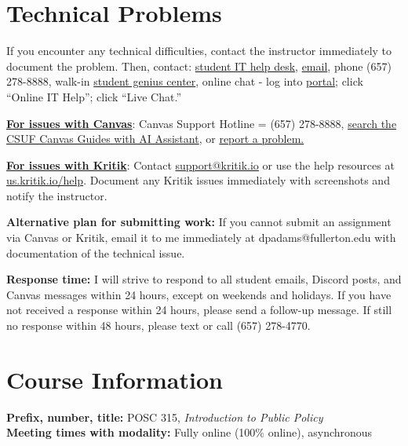\documentclass[12pt]{article}     %
\begin{document}
\section{Technical Problems}
If you encounter any technical difficulties, contact the instructor immediately to document the problem. Then, contact: \href{http://www.fullerton.edu/it/students/helpdesk/index.php}{student IT help desk}, \href{mailto:StudentITHelpDesk@fullerton.edu}{email}, phone (657) 278-8888, walk-in \href{http://www.fullerton.edu/it/students/sgc/index.php}{student genius center}, online chat - log into \href{http://my.fullerton.edu}{portal}; click ``Online IT Help''; click ``Live Chat.''

\vspace{0.5em}
\noindent \textbf{\underline{For issues with Canvas}}: Canvas Support Hotline = (657) 278-8888, \href{https://canvashelp.fullerton.edu/}{search the CSUF Canvas Guides with AI Assistant}, or \href{https://titans.service-now.com/sp?id=sc_cat_item&sys_id=f88efe80ebea6a10fb7cfcffcad0cdc6&subject=Canvas}{report a problem.}

\vspace{0.5em}
\noindent \textbf{\underline{For issues with Kritik}}: Contact \href{mailto:support@kritik.io}{support@kritik.io} or use the help resources at \href{https://us.kritik.io/help}{us.kritik.io/help}. Document any Kritik issues immediately with screenshots and notify the instructor.

\vspace{0.5em}
\noindent \textbf{Alternative plan for submitting work:} If you cannot submit an assignment via Canvas or Kritik, email it to me immediately at dpadams@fullerton.edu with documentation of the technical issue.

\vspace{0.5em}
\noindent \textbf{Response time:} I will strive to respond to all student emails, Discord posts, and Canvas messages within 24 hours, except on weekends and holidays. If you have not received a response within 24 hours, please send a follow-up message. If still no response within 48 hours, please text or call (657) 278-4770.
\section{Course Information}
\noindent \textbf{Prefix, number, title:} POSC 315, \textit{Introduction to Public Policy} \\
\noindent \textbf{Meeting times with modality:} Fully online (100\% online), asynchronous
\end{document}
